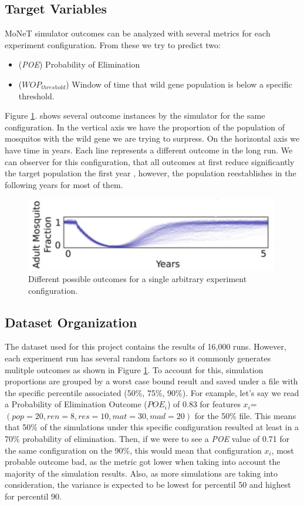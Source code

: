 \documentclass[12pt,letterpaper]{article}
\begin{document}
\subsection{Target Variables}
MoNeT simulator outcomes can be analyzed with several metrics for each experiment configuration.
From these we try to predict two:
\begin{itemize}
    \item (\emph{POE}) Probability of Elimination
    \item (\emph{$WOP_{threshold}$}) Window of time that wild gene population is below a specific threshold.
\end{itemize}
Figure \ref{img:randomsimoutcomes}. shows several outcome instances by the simulator for the same configuration.
In the vertical axis we have the proportion of the population of mosquitos with the wild gene we are trying to surpress.
On the horizontal axis we have time in years. Each line represents a different outcome in the long run. 
We can observer for this configuration,
that all outcomes at first reduce significantly the target population the first year
, however, the population reestablishes in the following years for most of them.

\begin{figure}[h]
    \centering
    \includegraphics{randomsimoutcomes.jpg}
    \caption{Different possible outcomes for a single arbitrary experiment configuration.}
    \label{img:randomsimoutcomes}
\end{figure}

\subsection{Dataset Organization}
The dataset used for this project contains the results of 16,000 runs. However, each experiment run
has several random factors so it commonly generates mulitple outcomes as shown in Figure \ref{img:randomsimoutcomes}.
To account for this, simulation proportions are grouped by a worst case bound result and saved
under a file with the specific percentile associated (50\%, 75\%, 90\%). For example, let's say we 
read a Probability of Elimination Outcome ($POE_i$) of 0.83 for features $x_i$=$(pop=20, ren=8, res=10, mat=30, mad=20)$ for
the 50\% file. 
This means that 50\% of the simulations under this specific configuration resulted at least in a 70\% probability of elimination.
Then, if we were to see a \emph{POE} value of 0.71 for the same configuration on the 90\%, this would mean that configuration $x_i$,
most probable outcome bad, as the metric got lower when taking into account the majority of the simulation results.
Also, as more simulations are taking into consideration, the variance is expected to be lowest for percentil 50 and highest for percentil 90.
\end{document}
